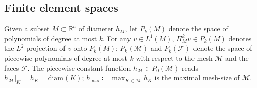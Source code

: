 \documentclass[a4paper]{amsart}
\numberwithin{equation}{section}
\newcommand{\R}{\mathbb{R}}
\newcommand{\Mcal}{\mathcal{M}}
\newcommand{\osc}{\mathrm{osc}}
\theoremstyle{remark}
\begin{document}
\subsection{Finite element spaces}\label{sec:fem-spaces}
Given a subset $M \subset \R^n$ of diameter $h_M$, let $P_k(M)$ denote the space of polynomials of degree at most $k$.
For any $v \in L^1(M)$, $\Pi_M^k v \in P_k(M)$ denotes the $L^2$ projection of $v$ onto $P_k(M)$;
$P_k(\mathcal{M})$ and $P_k(\mathcal{F})$ denote 
the space of piecewise polynomials of degree at most $k$ with respect to the mesh $\mathcal{M}$ and the faces $\mathcal{F}$.
The piecewise constant function $h_\Mcal \in P_0(\Mcal)$ reads $h_\Mcal|_K = h_K = \mathrm{diam}(K)$; $h_{\max} \coloneqq \max_{K \in \Mcal} h_K$ is the maximal mesh-size of $\Mcal$.
\end{document}
